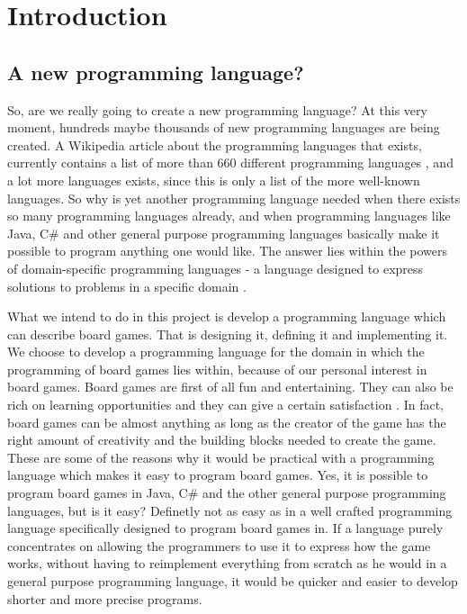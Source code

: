 \chapter{Introduction}
\label{chap:introduction}

\section{A new programming language?}
So, are we really going to create a new programming language? At this very moment, hundreds maybe thousands of new programming languages are being created. A Wikipedia article about the programming languages that exists, currently contains a list of more than 660 different programming languages \cite{listofprogramminglanguages}, and a lot more languages exists, since this is only a list of the more well-known languages. So why is yet another programming language needed when there exists so many programming languages already, and when programming languages like Java, C\# and other general purpose programming languages basically make it possible to program anything one would like. The answer lies within the powers of domain-specific programming languages - a language designed to express solutions to problems in a specific domain \cite{domainspecificprogramminglanguagedefinition}. 

What we intend to do in this project is develop a programming language which can describe board games. That is designing it, defining it and implementing it. We choose to develop a programming language for the domain in which the programming of board games lies within, because of our personal interest in board games. Board games are first of all fun and entertaining. They can also be rich on learning opportunities \cite{whyboardgames1?} and they can give a certain satisfaction \cite{whyboardgames2?}. In fact, board games can be almost anything as long as the creator of the game has the right amount of creativity and the building blocks needed to create the game. These are some of the reasons why it would be practical with a programming language which makes it easy to program board games. Yes, it is possible to program board games in Java, C\# and the other general purpose programming languages, but is it easy? Definetly not as easy as in a well crafted programming language specifically designed to program board games in. If a language purely concentrates on allowing the programmers to use it to express how the game works, without having to reimplement everything from scratch as he would in a general purpose programming language, it would be quicker and easier to develop shorter and more precise programs.  

